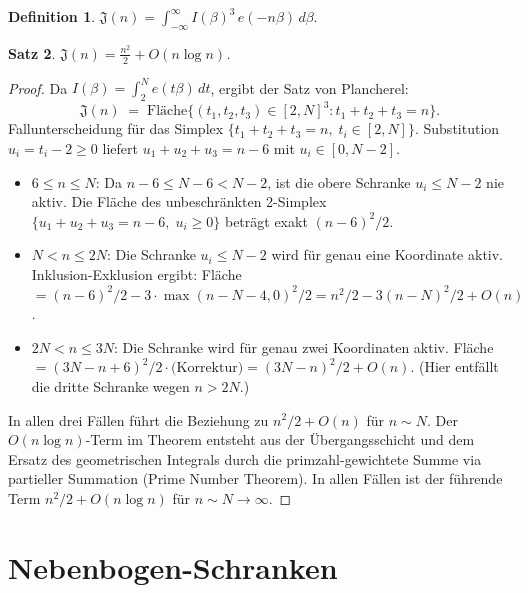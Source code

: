 \documentclass[12pt,a4paper]{amsart}
\newtheorem{theorem}{Satz}[section]
\theoremstyle{definition}
\newtheorem{definition}[theorem]{Definition}
\newcommand{\eq}[1]{e\!\left(#1\right)}
\begin{document}
\begin{definition}
  $\mathfrak{J}(n) = \int_{-\infty}^{\infty} I(\beta)^3\, \eq{-n\beta}\, d\beta$.
\end{definition}

\begin{theorem}\label{thm:sing_int}
  $\mathfrak{J}(n) = \frac{n^2}{2} + O(n \log n)$.
\end{theorem}

\begin{proof}
  Da $I(\beta) = \int_2^N \eq{t\beta}\, dt$, ergibt der Satz von Plancherel:
  \[
    \mathfrak{J}(n)
    \;=\; \text{Fläche}\bigl\{(t_1,t_2,t_3) \in [2,N]^3 : t_1+t_2+t_3 = n\bigr\}.
  \]
  Fallunterscheidung für das Simplex $\{t_1+t_2+t_3=n,\; t_i \in [2,N]\}$.
  Substitution $u_i = t_i - 2 \geq 0$ liefert $u_1+u_2+u_3 = n-6$ mit $u_i \in [0, N-2]$.
  \begin{itemize}
    \item $6 \leq n \leq N$: Da $n-6 \leq N-6 < N-2$, ist die obere Schranke $u_i \leq N-2$
      nie aktiv. Die Fläche des unbeschränkten 2-Simplex $\{u_1+u_2+u_3=n-6,\; u_i\geq 0\}$
      beträgt exakt $(n-6)^2/2$.
    \item $N < n \leq 2N$: Die Schranke $u_i \leq N-2$ wird für genau eine Koordinate
      aktiv. Inklusion-Exklusion ergibt:
      Fläche $= (n-6)^2/2 - 3\cdot\max(n-N-4,0)^2/2 = n^2/2 - 3(n-N)^2/2 + O(n)$.
    \item $2N < n \leq 3N$: Die Schranke wird für genau zwei Koordinaten aktiv.
      Fläche $= (3N-n+6)^2/2 \cdot \text{(Korrektur)} = (3N-n)^2/2 + O(n)$.
      (Hier entfällt die dritte Schranke wegen $n > 2N$.)
  \end{itemize}
  In allen drei Fällen führt die Beziehung zu $n^2/2 + O(n)$ für $n \sim N$.
  Der $O(n\log n)$-Term im Theorem entsteht aus der Übergangsschicht und dem
  Ersatz des geometrischen Integrals durch die primzahl-gewichtete Summe
  via partieller Summation (Prime Number Theorem).
  In allen Fällen ist der führende Term $n^2/2 + O(n\log n)$ für $n \sim N \to \infty$.
  \qedhere
\end{proof}

\section{Nebenbogen-Schranken}
\label{sec:nebenbogen}
\end{document}
